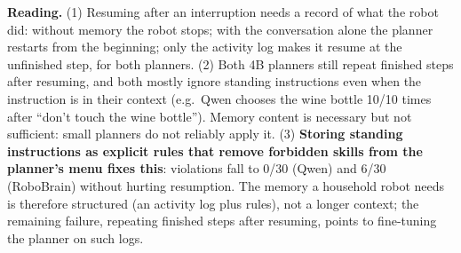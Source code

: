 \documentclass[10pt,a4paper]{article}
\begin{document}
\noindent\textbf{Reading.} (1) Resuming after an interruption needs a record of what the robot did: without memory the robot stops; with the conversation alone the planner restarts from the beginning; only the activity log makes it resume at the unfinished step, for both planners. (2) Both 4B planners still repeat finished steps after resuming, and both mostly ignore standing instructions even when the instruction is in their context (e.g.\ Qwen chooses the wine bottle 10/10 times after ``don't touch the wine bottle''). Memory content is necessary but not sufficient: small planners do not reliably apply it. (3) \textbf{Storing standing instructions as explicit rules that remove forbidden skills from the planner's menu fixes this}: violations fall to 0/30 (Qwen) and 6/30 (RoboBrain) without hurting resumption. The memory a household robot needs is therefore structured (an activity log plus rules), not a longer context; the remaining failure, repeating finished steps after resuming, points to fine-tuning the planner on such logs.
\end{document}
